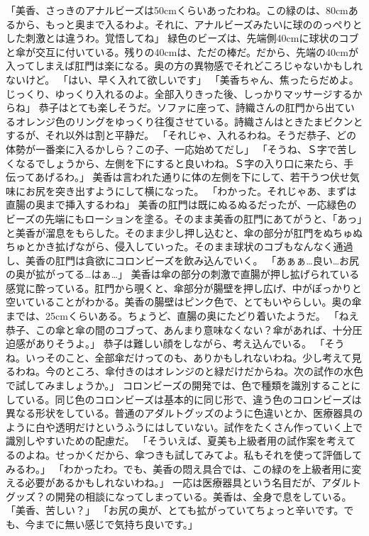 「美香、さっきのアナルビーズは50cmくらいあったわね。この緑のは、80cmあるから、もっと奥まで入るわよ。それに、アナルビーズみたいに球ののっぺりとした刺激とは違うわ。覚悟してね」
緑色のビーズは、先端側40cmに球状のコブと傘が交互に付いている。残りの40cmは、ただの棒だ。だから、先端の40cmが入ってしまえば肛門は楽になる。奥の方の異物感でそれどころじゃないかもしれないけど。
「はい、早く入れて欲しいです」
「美香ちゃん、焦ったらだめよ。じっくり、ゆっくり入れるのよ。全部入りきった後、しっかりマッサージするからね」
恭子はとても楽しそうだ。ソファに座って、詩織さんの肛門から出ているオレンジ色のリングをゆっくり往復させている。詩織さんはときたまビクンとするが、それ以外は割と平静だ。
「それじゃ、入れるわね。そうだ恭子、どの体勢が一番楽に入るかしら？この子、一応始めてだし」
「そうね、Ｓ字で苦しくなるでしょうから、左側を下にすると良いわね。Ｓ字の入り口に来たら、手伝ってあげるわ。」
美香は言われた通りに体の左側を下にして、若干うつ伏せ気味にお尻を突き出すようにして横になった。
「わかった。それじゃあ、まずは直腸の奥まで挿入するわね」
美香の肛門は既にぬるぬるだったが、一応緑色のビーズの先端にもローションを塗る。そのまま美香の肛門にあてがうと、「あっ」と美香が溜息をもらした。そのまま少し押し込むと、傘の部分が肛門をぬちゅぬちゅとかき拡げながら、侵入していった。そのまま球状のコブもなんなく通過し、美香の肛門は貪欲にコロンビーズを飲み込んでいく。
「あぁぁ…良い…お尻の奥が拡がってる…はぁ…」
美香は傘の部分の刺激で直腸が押し拡げられている感覚に酔っている。肛門から覗くと、傘部分が腸壁を押し広げ、中がぽっかりと空いていることがわかる。美香の腸壁はピンク色で、とてもいやらしい。奥の傘までは、25cmくらいある。ちょうど、直腸の奥にたどり着いたようだ。
「ねえ恭子、この傘と傘の間のコブって、あんまり意味なくない？傘があれば、十分圧迫感がありそうよ。」
恭子は難しい顔をしながら、考え込んでいる。
「そうね。いっそのこと、全部傘だけってのも、ありかもしれないわね。少し考えて見るわね。今のところ、傘付きのはオレンジのと緑だけだからね。次の試作の水色で試してみましょうか。」
コロンビーズの開発では、色で種類を識別することにしている。同じ色のコロンビーズは基本的に同じ形で、違う色のコロンビーズは異なる形状をしている。普通のアダルトグッズのように色違いとか、医療器具のように白や透明だけというふうにはしていない。試作をたくさん作っていく上で識別しやすいための配慮だ。
「そういえば、夏美も上級者用の試作案を考えてるのよね。せっかくだから、傘つきも試してみてよ。私もそれを使って評価してみるわ。」
「わかったわ。でも、美香の悶え具合では、この緑のを上級者用に変える必要があるかもしれないわね。」
一応は医療器具という名目だが、アダルトグッズ？の開発の相談になってしまっている。美香は、全身で息をしている。
「美香、苦しい？」
「お尻の奥が、とても拡がっていてちょっと辛いです。でも、今までに無い感じで気持ち良いです。」
